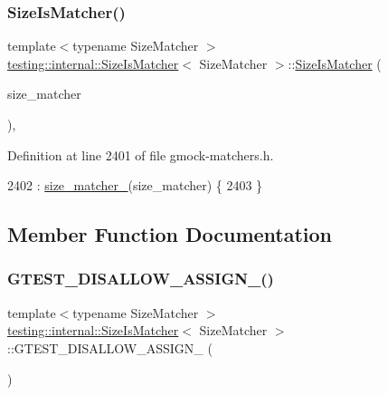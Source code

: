 \subsubsection{\texorpdfstring{Size\+Is\+Matcher()}{SizeIsMatcher()}}
{\footnotesize\ttfamily template$<$typename Size\+Matcher $>$ \\
\hyperlink{classtesting_1_1internal_1_1SizeIsMatcher}{testing\+::internal\+::\+Size\+Is\+Matcher}$<$ Size\+Matcher $>$\+::\hyperlink{classtesting_1_1internal_1_1SizeIsMatcher}{Size\+Is\+Matcher} (\begin{DoxyParamCaption}\item[{const Size\+Matcher \&}]{size\+\_\+matcher }\end{DoxyParamCaption})\hspace{0.3cm}{\ttfamily [inline]}, {\ttfamily [explicit]}}



Definition at line 2401 of file gmock-\/matchers.\+h.


\begin{DoxyCode}
2402        : \hyperlink{classtesting_1_1internal_1_1SizeIsMatcher_aa5a60a11ee3fb9021024e0306cf2a2a0}{size\_matcher\_}(size\_matcher) \{
2403   \}
\end{DoxyCode}


\subsection{Member Function Documentation}
\mbox{\label{classtesting_1_1internal_1_1SizeIsMatcher_a986a0ee808657d0d86684ad2b4edb89f}} 
\subsubsection{\texorpdfstring{G\+T\+E\+S\+T\+\_\+\+D\+I\+S\+A\+L\+L\+O\+W\+\_\+\+A\+S\+S\+I\+G\+N\+\_\+()}{GTEST\_DISALLOW\_ASSIGN\_()}}
{\footnotesize\ttfamily template$<$typename Size\+Matcher $>$ \\
\hyperlink{classtesting_1_1internal_1_1SizeIsMatcher}{testing\+::internal\+::\+Size\+Is\+Matcher}$<$ Size\+Matcher $>$\+::G\+T\+E\+S\+T\+\_\+\+D\+I\+S\+A\+L\+L\+O\+W\+\_\+\+A\+S\+S\+I\+G\+N\+\_\+ (\begin{DoxyParamCaption}\item[{\hyperlink{classtesting_1_1internal_1_1SizeIsMatcher}{Size\+Is\+Matcher}$<$ Size\+Matcher $>$}]{ }\end{DoxyParamCaption})\hspace{0.3cm}{\ttfamily [private]}}


